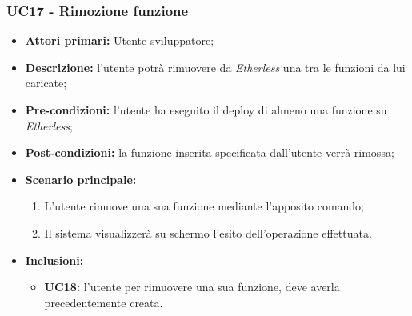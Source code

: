 \subsubsection{UC17 - Rimozione funzione}
\begin{itemize}
	\item \textbf{Attori primari:} Utente sviluppatore;
	\item \textbf{Descrizione:} l'utente potrà rimuovere da \textit{Etherless} una tra le funzioni da lui caricate; 
	\item \textbf{Pre-condizioni:} l'utente ha eseguito il deploy di almeno una funzione su \textit{Etherless};
	\item \textbf{Post-condizioni:} la funzione inserita specificata dall'utente verrà rimossa;
	\item \textbf{Scenario principale:} 
	\begin{enumerate}
		\item L'utente rimuove una sua funzione mediante l'apposito comando;
		\item Il sistema visualizzerà su schermo l'esito dell'operazione effettuata.
	\end{enumerate}
	\item \textbf{Inclusioni:} 
	\begin{itemize}
		\item \textbf{UC18:} l'utente per rimuovere una sua funzione, deve averla precedentemente creata.
	\end{itemize}
\end{itemize}